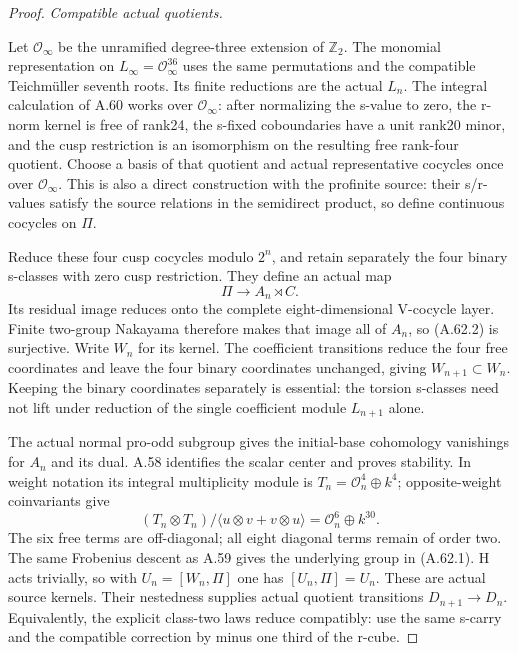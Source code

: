 \begin{proof}
\emph{Compatible actual quotients.}\par
Let \(\mathcal O_\infty\) be the unramified degree-three
extension of \(\mathbb Z_2\). The monomial representation
on \(L_\infty=\mathcal O_\infty^{36}\) uses the same
permutations and the compatible Teichm\"uller seventh roots.
Its finite reductions are the actual \(L_n\). The integral
calculation of A.60 works over \(\mathcal O_\infty\): after
normalizing the s-value to zero, the r-norm kernel is free
of rank24, the s-fixed coboundaries have a unit rank20 minor,
and the cusp restriction is an isomorphism on the resulting
free rank-four quotient. Choose a basis of that quotient and
actual representative cocycles once over \(\mathcal O_\infty\).
This is also a direct construction with the profinite source:
their s/r-values satisfy the source relations in the
semidirect product, so define continuous cocycles on \(\Pi\).

Reduce these four cusp cocycles modulo \(2^n\), and retain
separately the four binary s-classes with zero cusp restriction.
They define an actual map
\[
 \Pi\longrightarrow A_n\rtimes C.
 \tag{A.62.2}
\]
Its residual image reduces onto the complete eight-dimensional
V-cocycle layer. Finite two-group Nakayama therefore makes
that image all of \(A_n\), so (A.62.2) is surjective.
Write \(W_n\) for its kernel. The coefficient transitions
reduce the four free coordinates and leave the four binary
coordinates unchanged, giving \(W_{n+1}\subset W_n\).
Keeping the binary coordinates separately is essential:
the torsion s-classes need not lift under reduction of the
single coefficient module \(L_{n+1}\) alone.

The actual normal pro-odd subgroup gives the initial-base
cohomology vanishings for \(A_n\) and its dual. A.58
identifies the scalar center and proves stability. In
weight notation its integral multiplicity module is
\(T_n=\mathcal O_n^4\oplus k^4\); opposite-weight
coinvariants give
\[
 (T_n\otimes T_n)/\langle u\otimes v+v\otimes u\rangle
       =\mathcal O_n^6\oplus k^{30}.
 \tag{A.62.3}
\]
The six free terms are off-diagonal; all eight diagonal
terms remain of order two. The same Frobenius descent as
A.59 gives the underlying group in (A.62.1). H acts
trivially, so with \(U_n=[W_n,\Pi]\) one has
\([U_n,\Pi]=U_n\). These are actual source kernels.
Their nestedness supplies actual quotient transitions
\(D_{n+1}\to D_n\). Equivalently, the explicit class-two
laws reduce compatibly: use the same s-carry and the
compatible correction by minus one third of the r-cube.


\end{proof}
